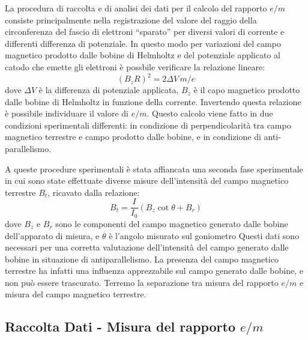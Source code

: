 \documentclass[a4paper,11pt]{article}
\newcommand{\virgolette}[1]{``#1''}
\begin{document}
		La procedura di raccolta e di analisi dei dati per il calcolo del rapporto $e/m$ consiste principalmente nella registrazione del valore del raggio della circonferenza del fascio di elettroni \virgolette{sparato} per diversi valori di corrente e differenti differenza di potenziale. In questo modo per variazioni del campo magnetico prodotto dalle bobine di Helmholtz e del potenziale applicato al catodo che emette gli elettroni è possbile verificare la relazione lineare:
		\begin{equation}\label{regressione}
		(B_z R)^2 = 2\Delta V \, m/e 
		\end{equation}
		dove $\Delta V$ è la differenza di potenziale applicata, $B_z$ è il capo magnetico prodotto dalle bobine di Helmholtz in funzione della corrente. Invertendo questa relazione è possibile individuare il valore di $e/m$. Questo calcolo viene fatto in due condizioni sperimentali differenti: in condizione di perpendicolarità tra campo magnetico terrestre e campo prodotto dalle bobine, e in condizione di anti-parallelismo.
		
		A queste procedure sperimentali è stata affiancata una seconda fase sperimentale in cui sono state effettuate diverse misure dell'intensità del campo magnetico terrestre $B_t$, ricavato dalla relazione:
		\begin{equation}\label{B_terra}
		B_t= \frac{I}{I_0} (B_z \cot \theta + B_r) 
		\end{equation}
		dove $B_z$ e $B_r$ sono le componenti del campo magnetico generato dalle bobine dell'apparato di misura, e $\theta$ è l'angolo misurato sul goniometro
		Questi dati sono necessari per una corretta valutazione dell'intensità del campo generato dalle bobine in situazione di antiparallelismo. La presenza del campo magnetico terrestre ha infatti una influenza apprezzabile sul campo generato dalle bobine, e non può essere trascurato. Terremo la separazione tra misura del rapporto $e/m$ e misura del campo magnetico terrestre.
		
		\subsection{Raccolta Dati - Misura del rapporto $e/m$}
		
\end{document}
